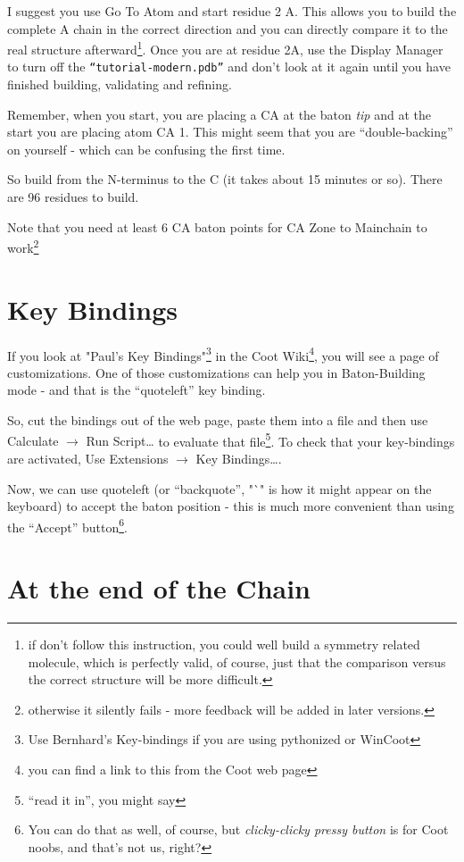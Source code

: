 \documentclass{article}
\begin{document}
I suggest you use Go To Atom and start residue 2 A. This allows you to
build the complete A chain in the correct direction and you can
directly compare it to the real structure afterward\footnote{if don't
  follow this instruction, you could well build a symmetry related
  molecule, which is perfectly valid, of course, just that the
  comparison versus the correct structure will be more difficult.}.
Once you are at residue 2A, use the Display Manager to turn off the
{\small\texttt{``tutorial-modern.pdb''}} and don't look at it again
until you have finished building, validating and refining.
  
Remember, when you start, you are placing a CA at the baton
\emph{tip} and at the start you are placing atom CA 1.  This might
seem that you are ``double-backing'' on yourself - which can be
confusing the first time.

So build from the N-terminus to the C (it takes about 15 minutes or
so).  There are 96 residues to build.

Note that you need at least 6 CA baton points for CA Zone to Mainchain
to work\footnote{otherwise it silently fails - more feedback will be
  added in later versions.}

\section{Key Bindings}

If you look at "Paul's Key Bindings"\footnote{Use Bernhard's
  Key-bindings if you are using pythonized or WinCoot} in
the Coot Wiki\footnote{you can find a link to this from the Coot web
  page}, you will see a page of customizations.  One of those
customizations can help you in Baton-Building mode - and that is the
``quoteleft'' key binding.

So, cut the bindings out of the web page, paste them into a file and
then use \textsf{Calculate $\rightarrow$ Run Script\ldots} to evaluate
that file\footnote{``read it in'', you might say}.  To check that your
key-bindings are activated, Use \textsf{Extensions $\rightarrow$ Key
  Bindings\ldots}.

Now, we can use quoteleft (or ``backquote'', "`" is how it might
appear on the keyboard) to accept the baton position - this is much
more convenient than using the ``Accept'' button\footnote{You can do
  that as well, of course, but \emph{clicky-clicky pressy button} is for
Coot noobs, and that's not us, right?}.


\section{At the end of the Chain} 
\end{document}
